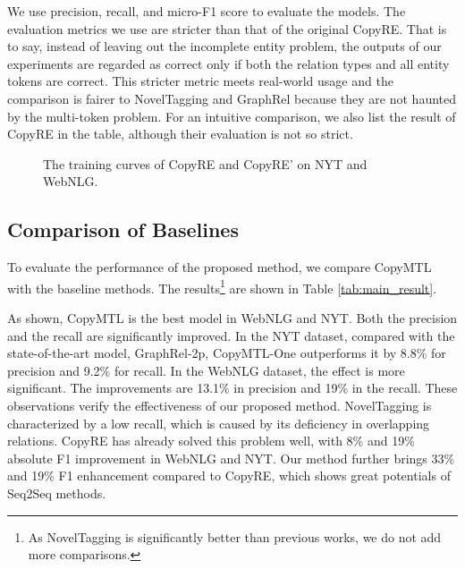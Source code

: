 \documentclass[letterpaper]{article} \usepackage{aaai20}  \usepackage{times}  \usepackage{helvet} \usepackage{courier}  \usepackage[hyphens]{url}  \usepackage{graphicx}
\begin{document}
We use precision, recall, and micro-F1 score to evaluate the models. 
      The evaluation metrics we use are stricter than that of the original CopyRE.
      That is to say, instead of leaving out the incomplete entity problem, the outputs of our experiments are regarded as correct only if both the relation types and all entity tokens are correct.     
      This stricter metric meets real-world usage and the comparison is fairer to NovelTagging and GraphRel because they are not haunted by the multi-token problem. For an intuitive comparison, we also list the result of CopyRE in the table, although their evaluation is not so strict.
      \begin{figure*}[t]
        \centering
        \caption{The training curves of CopyRE and CopyRE' on NYT and WebNLG. }
          \label{fig:training_curve}
        \end{figure*}
  
  \subsection{Comparison of Baselines}
  
      
      To evaluate the performance of the proposed method, we compare CopyMTL with the baseline methods.
The results\footnote{As NovelTagging is significantly better than previous works, we do not add more comparisons.} are shown in Table \ref{tab:main_result}.


      As shown, CopyMTL is the best model in WebNLG and NYT.
      Both the precision and the recall are significantly improved. 
      In the NYT dataset, compared with the state-of-the-art model, {GraphRel-2p}, CopyMTL-One outperforms it by 8.8\% for precision and 9.2\% for recall.     
      In the WebNLG dataset, the effect is more significant.
      The improvements are 13.1\% in precision and 19\% in the recall.
      These observations verify the effectiveness of our proposed method.
      NovelTagging is characterized by a low recall, which is caused by its deficiency in overlapping relations. CopyRE has already solved this problem well, with 8\% and 19\% absolute F1 improvement in WebNLG and NYT. Our method further brings 33\% and 19\% F1 enhancement compared to CopyRE, which shows great potentials of Seq2Seq methods. 
    
\end{document}

